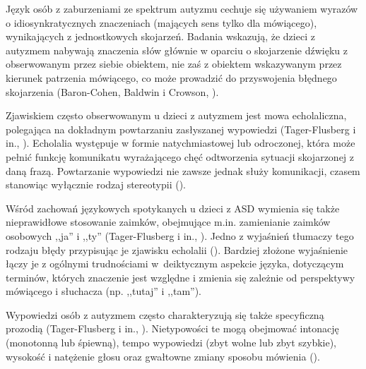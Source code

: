     Język osób z zaburzeniami ze spektrum autyzmu cechuje się używaniem wyrazów o idiosynkratycznych znaczeniach (mających sens tylko dla mówiącego), wynikających z jednostkowych skojarzeń.
    Badania wskazują, że dzieci z autyzmem nabywają znaczenia słów głównie w oparciu o skojarzenie dźwięku z obserwowanym przez siebie obiektem, nie zaś z obiektem wskazywanym przez kierunek patrzenia mówiącego, co może prowadzić do przyswojenia błędnego skojarzenia (Baron-Cohen, Baldwin i Crowson, \cite*{baron1997children}).
    
    Zjawiskiem często obserwowanym u dzieci z autyzmem jest mowa echolaliczna, polegająca na dokładnym powtarzaniu zasłyszanej wypowiedzi (Tager-Flusberg i in., \cite*{tager2005language}).
    Echolalia występuje w formie natychmiastowej lub odroczonej, która może pełnić funkcję komunikatu wyrażającego chęć odtworzenia sytuacji skojarzonej z daną frazą.
    Powtarzanie wypowiedzi nie zawsze jednak służy komunikacji, czasem stanowiąc wyłącznie rodzaj stereotypii (\cite{frith2008autyzm}).
    
    Wśród zachowań językowych spotykanych u dzieci z ASD wymienia się także nieprawidłowe stosowanie zaimków, obejmujące m.in. zamienianie zaimków osobowych ,,ja'' i ,,ty'' (Tager-Flusberg i in., \cite*{tager2005language}).
    Jedno z wyjaśnień tłumaczy tego rodzaju błędy przypisując je zjawisku echolalii (\cite{frith2008autyzm}).
    Bardziej złożone wyjaśnienie łączy je z ogólnymi trudnościami w~deiktycznym aspekcie języka, dotyczącym terminów, których znaczenie jest względne i zmienia się zależnie od perspektywy mówiącego i słuchacza (np. ,,tutaj'' i ,,tam'').
    
    Wypowiedzi osób z autyzmem często charakteryzują się także specyficzną prozodią (Tager-Flusberg i in., \cite*{tager2005language}).
    Nietypowości te mogą obejmować intonację (monotonną lub śpiewną), tempo wypowiedzi (zbyt wolne lub zbyt szybkie), wysokość i natężenie głosu oraz gwałtowne zmiany sposobu mówienia (\cite{frith2008autyzm}).
    
 
    
